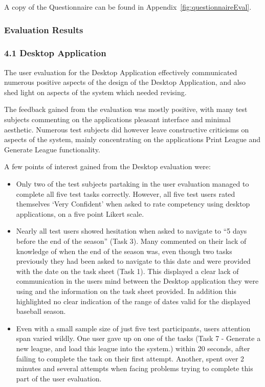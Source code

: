 A copy of the Questionnaire can be found in
Appendix~\ref{fig:questionnaireEval}.

\subsubsection{Evaluation Results}

\subsubsection{4.1 Desktop Application}

The user evaluation for the Desktop Application effectively communicated
numerous positive aspects of the design of the Desktop Application, and also
shed light on aspects of the system which needed revising.

The feedback gained from the evaluation was mostly positive, with many test
subjects commenting on the applications pleasant interface and minimal
aesthetic. Numerous test subjects did however leave constructive criticisms on
aspects of the system, mainly concentrating on the applications Print League
and Generate League functionality.

A few points of interest gained from the Desktop evaluation were:

\begin{itemize}
\item Only two of the test subjects partaking in the user evaluation managed to
complete all five test tasks correctly. However, all five test users rated
themselves `Very Confident' when asked to rate competency using desktop
applications, on a five point Likert scale.
\item Nearly all test users showed hesitation when asked to navigate to ``5
days before the end of the season'' (Task 3). Many commented on their lack of
knowledge of when the end of the season was, even though two tasks previously
they had been asked to navigate to this date and were provided with the date on
the task sheet (Task 1). This displayed a clear lack of communication in the
users mind between the Desktop application they were using and the information
on the task sheet provided. In addition this highlighted no clear indication of
the range of dates valid for the displayed baseball season.
\item Even with a small sample size of just five test participants, users
attention span varied wildly. One user gave up on one of the tasks (Task 7 -
Generate a new league, and load this league into the system.) within 20
seconds, after failing to complete the task on their first attempt. Another,
spent over 2 minutes and several attempts when facing problems trying to
complete this part of the user evaluation.
\end{itemize}


